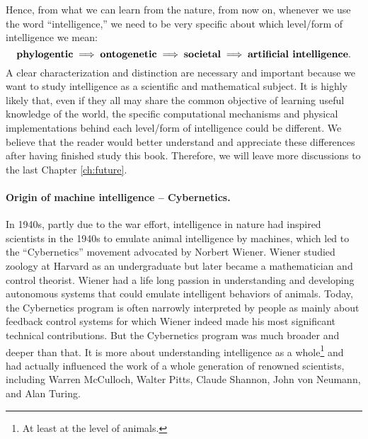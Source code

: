 \documentclass[../../book-main.tex]{subfiles}
\begin{document}
Hence, from what we can learn from the nature, from now on, whenever we use the word ``intelligence,'' we need to be very specific about which level/form of intelligence we mean:
\begin{equation}
\mbox{\textbf{phylogentic}} \;
   \Longrightarrow \; \mbox{\textbf{ontogenetic}} \; \Longrightarrow \; 
   \mbox{\textbf{societal}}
   \; \Longrightarrow \; 
   \mbox{\textbf{artificial intelligence}}.
\end{equation}
A clear characterization and distinction are necessary and important because we want to study intelligence as a scientific and mathematical subject. It is highly likely that, even if they all may share the common objective of learning useful knowledge of the world, the specific computational mechanisms and physical implementations behind each level/form of intelligence could be different. We believe that the reader would better understand and appreciate these differences after having finished study this book. Therefore, we will leave more discussions to the last Chapter \ref{ch:future}.





\paragraph{Origin of machine intelligence -- Cybernetics.}
In 1940s, partly due to the war effort, intelligence in nature had inspired scientists in the 1940s to emulate animal intelligence by machines, which led to the ``Cybernetics''  movement advocated by Norbert Wiener. Wiener studied zoology at Harvard as an undergraduate but later became a mathematician and control theorist. Wiener had a life long passion in understanding and developing autonomous systems that could emulate intelligent behaviors of animals. Today, the Cybernetics program is often narrowly interpreted by people as mainly about feedback control systems for which Wiener indeed made his most significant technical contributions. But the Cybernetics program was much broader and deeper than that. It is more about understanding intelligence as a whole\footnote{At least at the level of animals.} and had actually influenced the work of a whole generation of renowned scientists, including Warren McCulloch, Walter Pitts, Claude Shannon, John von Neumann, and Alan Turing.  
\end{document}
